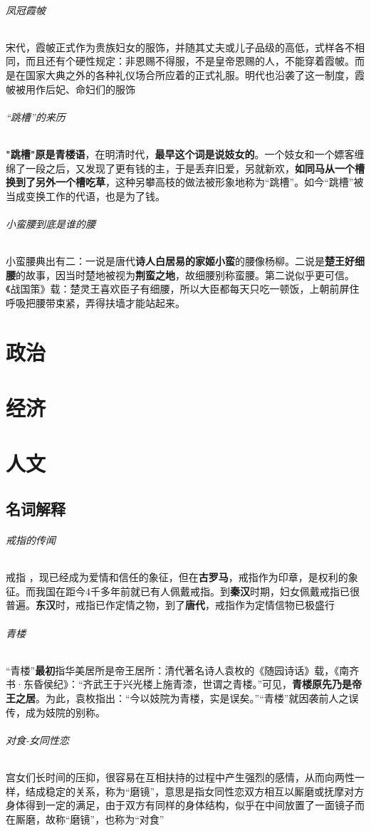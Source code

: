 \documentclass[UTF8,a4paper,12pt]{ctexbook}
\begin{document}
		\subparagraph{凤冠霞帔}宋代，霞帔正式作为贵族妇女的服饰，并随其丈夫或儿子品级的高低，式样各不相同，而且还有个硬性规定：非恩赐不得服，不是皇帝恩赐的人，不能穿着霞帔。而是在国家大典之外的各种礼仪场合所应着的正式礼服。明代也沿袭了这一制度，霞帔被用作后妃、命妇们的服饰
		
		\subparagraph{“跳槽”的来历}\textbf{"跳槽"原是青楼语}，在明清时代，\textbf{最早这个词是说妓女的}。一个妓女和一个嫖客缠绵了一段之后，又发现了更有钱的主，于是丢弃旧爱，另就新欢，\textbf{如同马从一个槽换到了另外一个槽吃草}，这种另攀高枝的做法被形象地称为“跳槽”。如今“跳槽”被当成变换工作的代语，也是为了钱。	
			
		\subparagraph{小蛮腰到底是谁的腰}小蛮腰典出有二：一说是唐代\textbf{诗人白居易的家姬小蛮}的腰像杨柳。二说是\textbf{楚王好细腰}的故事，因当时楚地被视为\textbf{荆蛮之地}，故细腰别称蛮腰。第二说似乎更可信。《战国策》载：楚灵王喜欢臣子有细腰，所以大臣都每天只吃一顿饭，上朝前屏住呼吸把腰带束紧，弄得扶墙才能站起来。
\chapter{政治}


\chapter{经济}


\chapter{人文}
	\section{名词解释}
		\subparagraph{戒指的传闻}戒指 ，现已经成为爱情和信任的象征，但在\textbf{古罗马}，戒指作为印章，是权利的象征。而我国在距今4千多年前就已有人佩戴戒指。到\textbf{秦汉}时期，妇女佩戴戒指已很普遍。\textbf{东汉}时，戒指已作定情之物，到了\textbf{唐代}，戒指作为定情信物已极盛行
		
		\subparagraph{青楼}“青楼”\textbf{最初}指华美居所是帝王居所：清代著名诗人袁枚的《随园诗话》载，《南齐书·东昏侯纪》：“齐武王于兴光楼上施青漆，世谓之青楼。”可见，\textbf{青楼原先乃是帝王之居}。为此，袁枚指出：“今以妓院为青楼，实是误矣。”“青楼”就因袭前人之误传，成为妓院的别称。
		
		\subparagraph{对食-女同性恋}宫女们长时间的压抑，很容易在互相扶持的过程中产生强烈的感情，从而向两性一样，结成稳定的关系，称为“磨镜”，意思是指女同性恋双方相互以厮磨或抚摩对方身体得到一定的满足，由于双方有同样的身体结构，似乎在中间放置了一面镜子而在厮磨，故称“磨镜”，也称为“对食”
	
\end{document}
